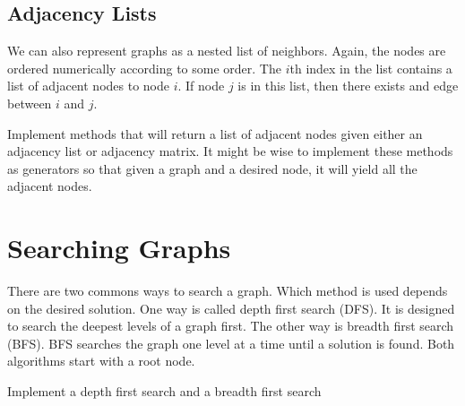 \subsection*{Adjacency Lists}
We can also represent graphs as a nested list of neighbors.
Again, the nodes are ordered numerically according to some order.
The $i$th index in the list contains a list of adjacent nodes to node $i$.  
If node $j$ is in this list, then there exists and edge between $i$ and $j$.

\begin{problem}
Implement methods that will return a list of adjacent nodes given either an adjacency list or adjacency matrix.
It might be wise to implement these methods as generators so that given a graph and a desired node, it will yield all the adjacent nodes.
\end{problem}

\section*{Searching Graphs}
There are two commons ways to search a graph.
Which method is used depends on the desired solution.
One way is called depth first search (DFS).  It is designed to search the deepest levels of a graph first.
The other way is breadth first search (BFS).  BFS searches the graph one level at a time until a solution is found.
Both algorithms start with a root node.

\begin{problem}
Implement a depth first search and a breadth first search
\end{problem}

